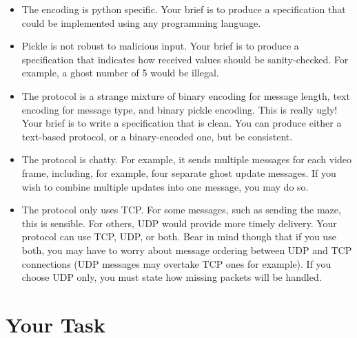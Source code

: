 \documentclass{article}
\begin{document}
\begin{itemize}
\item The encoding is python specific.  Your brief is to produce a specification that could be implemented using any programming language.
\item Pickle is not robust to malicious input.  Your brief is to
  produce a specification that indicates how received values should be
  sanity-checked.  For example, a ghost number of 5 would be illegal.
\item The protocol is a strange mixture of binary encoding for message length, text encoding for message type, and binary pickle encoding.  This is really ugly!  Your brief is to write a specification that is clean.  You can produce either a text-based protocol, or a binary-encoded one, but be consistent.
\item The protocol is chatty.  For example, it sends multiple messages
  for each video frame, including, for example, four separate ghost
  update messages.  If you wish to combine multiple updates into one
  message, you may do so.
\item The protocol only uses TCP.  For some messages, such as sending
  the maze, this is sensible.  For others, UDP would provide more
  timely delivery.  Your protocol can use TCP, UDP, or both.  Bear in
  mind though that if you use both, you may have to worry about
  message ordering between UDP and TCP connections (UDP messages may
  overtake TCP ones for example).  If you choose UDP only, you must
  state how missing packets will be handled.
\end{itemize}

\section{Your Task}
\end{document}
